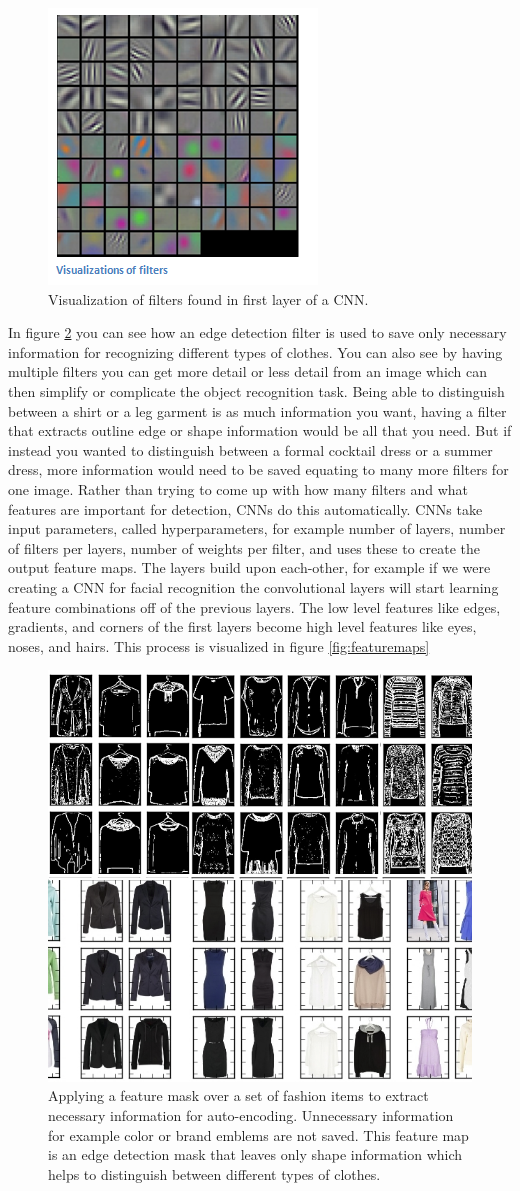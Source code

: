 \begin{figure}[htp!]
\centering
\includegraphics[width=.25\textwidth]{figs/conv1vis.png}
\caption{Visualization of filters found in first layer of a CNN.}
\label{fig:curvedetector}
\end{figure} 

In figure \ref{fig:convolution} you can see how an edge detection filter is used to save only necessary information for recognizing different types of clothes. You can also see by having multiple filters you can get more detail or less detail from an image which can then simplify or complicate the object recognition task. Being able to distinguish between a shirt or a leg garment is as much information you want, having a filter that extracts outline edge or shape information would be all that you need. But if instead you wanted to distinguish between a formal cocktail dress or a summer dress, more information would need to be saved equating to many more filters for one image. Rather than trying to come up with how many filters and what features are important for detection, CNNs do this automatically. CNNs take input parameters, called hyperparameters, for example number of layers, number of filters per layers, number of weights per filter, and uses these to create the output feature maps. The layers build upon each-other, for example if we were creating a CNN for facial recognition the convolutional layers will start learning feature combinations off of the previous layers. The low level features like edges, gradients, and corners of the first layers become high level features like eyes, noses, and hairs. This process is visualized in figure \ref{fig:featuremaps} 

\begin{figure}[t!]
\centering
\includegraphics[width=.48\linewidth]{figs/convolution.png}
\caption{Applying a feature mask over a set of fashion items to extract necessary information for auto-encoding. Unnecessary information for example color or brand emblems are not saved. This feature map is an edge detection mask that leaves only shape information which helps to distinguish between different types of clothes.} 
\label{fig:convolution}
\end{figure}

